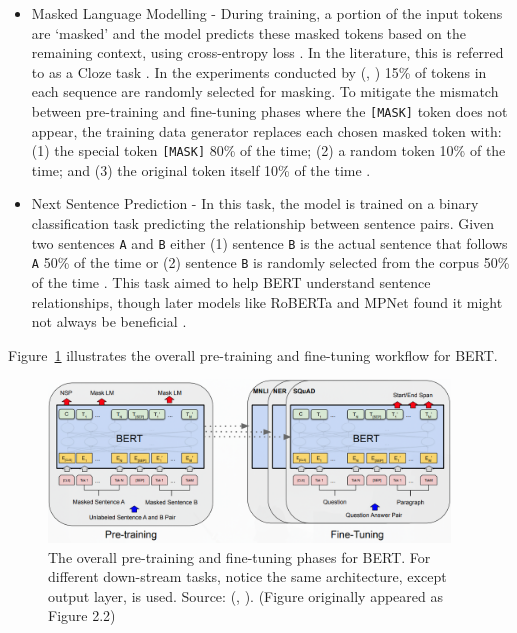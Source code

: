 \documentclass[10pt,oneside]{report}
\renewcommand{\citet}[1]{\citeauthor{#1}, \citeyear{#1}}
\begin{document}
\begin{itemize}
    \item Masked Language Modelling - During training, a portion of the input tokens are `masked' and the model predicts these masked tokens based on the remaining context, using cross-entropy loss \cite{zhang2018generalized}. In the literature, this is referred to as a Cloze task \cite{taylor1953cloze}. In the experiments conducted by (\citet{devlin2019bert}) 15\% of tokens in each sequence are randomly selected for masking. To mitigate the mismatch between pre-training and fine-tuning phases where the \texttt{[MASK]} token does not appear, the training data generator replaces each chosen masked token with: (1) the special token \texttt{[MASK]} 80\% of the time; (2) a random token 10\% of the time; and (3) the original token itself 10\% of the time \cite{devlin2019bert}.

    \item Next Sentence Prediction - In this task, the model is trained on a binary classification task predicting the relationship between sentence pairs. Given two sentences \texttt{A} and \texttt{B} either (1) sentence \texttt{B} is the actual sentence that follows \texttt{A} 50\% of the time or (2) sentence \texttt{B} is randomly selected from the corpus 50\% of the time \cite{devlin2019bert}. This task aimed to help BERT understand sentence relationships, though later models like RoBERTa and MPNet found it might not always be beneficial \cite{liu2019roberta, song2020mpnet}. %
\end{itemize}

Figure~\ref{fig:bert1_appendix} illustrates the overall pre-training and fine-tuning workflow for BERT.

\begin{figure}[htbp]
    \centering
    \includegraphics[width=0.95\textwidth]{BERT1.png} %
    \caption[BERT Pre-training and Fine-tuning Phases (Appendix)]{The overall pre-training and fine-tuning phases for BERT. For different down-stream tasks, notice the same architecture, except output layer, is used. Source: (\citet{devlin2019bert}). (Figure originally appeared as Figure 2.2)}
    \label{fig:bert1_appendix} %
\end{figure}
\end{document}
